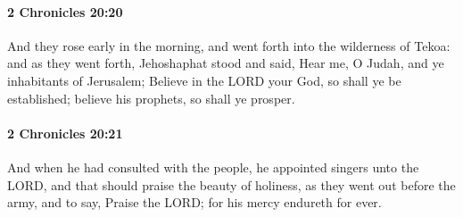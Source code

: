 		\paragraph{2 Chronicles 20:20} %
			\label{2CHRONICLES-20-20}

			And they rose early in the morning, and went forth into the wilderness of Tekoa: and as they went forth, Jehoshaphat stood and said, Hear me, O Judah, and ye inhabitants of Jerusalem; Believe in the LORD your God, so shall ye be established; believe his prophets, so shall ye prosper.


		\paragraph{2 Chronicles 20:21} %
			\label{2CHRONICLES-20-21}

			And when he had consulted with the people, he appointed singers unto the LORD, and that should praise the beauty of holiness, as they went out before the army, and to say, Praise the LORD; for his mercy endureth for ever.

